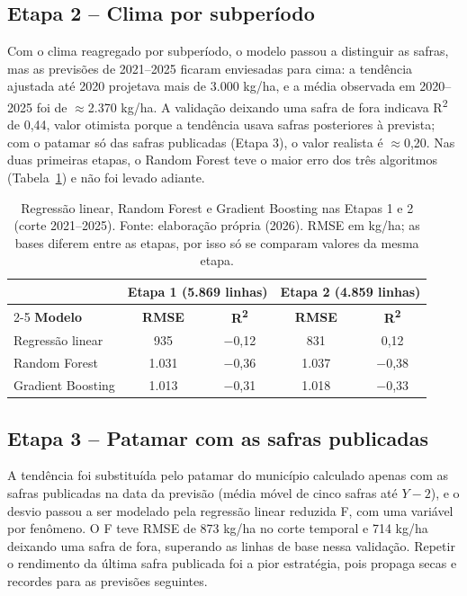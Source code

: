 \documentclass[12pt]{article}
\begin{document}
\subsection{Etapa 2 -- Clima por subperíodo}

Com o clima reagregado por subperíodo, o modelo passou a distinguir as
safras, mas as previsões de 2021--2025 ficaram enviesadas para cima: a
tendência ajustada até 2020 projetava mais de 3.000 kg/ha, e a média
observada em 2020--2025 foi de $\approx$2.370 kg/ha. A validação deixando
uma safra de fora indicava R\textsuperscript{2} de 0,44, valor otimista
porque a tendência usava safras posteriores à prevista; com o patamar só
das safras publicadas (Etapa 3), o valor realista é $\approx$0,20. Nas
duas primeiras etapas, o Random Forest teve o maior erro dos três
algoritmos (Tabela~\ref{tab:rf}) e não foi levado adiante.

\begin{table}[ht]
\centering
\caption{Regressão linear, Random Forest e Gradient Boosting nas Etapas 1
  e 2 (corte 2021--2025). Fonte: elaboração própria (2026). RMSE em
  kg/ha; as bases diferem entre as etapas, por isso só se comparam valores
  da mesma etapa.}
\label{tab:rf}
\begin{tabular}{|p{4.4cm}|c|c|c|c|}
\hline
 & \multicolumn{2}{c|}{\textbf{Etapa 1 (5.869 linhas)}} &
   \multicolumn{2}{c|}{\textbf{Etapa 2 (4.859 linhas)}} \\ \cline{2-5}
\textbf{Modelo} & \textbf{RMSE} & \textbf{R\textsuperscript{2}} &
  \textbf{RMSE} & \textbf{R\textsuperscript{2}} \\ \hline
Regressão linear & 935 & $-$0,12 & 831 & 0,12 \\ \hline
Random Forest & 1.031 & $-$0,36 & 1.037 & $-$0,38 \\ \hline
Gradient Boosting & 1.013 & $-$0,31 & 1.018 & $-$0,33 \\ \hline
\end{tabular}
\end{table}

\subsection{Etapa 3 -- Patamar com as safras publicadas}

A tendência foi substituída pelo patamar do município calculado apenas
com as safras publicadas na data da previsão (média móvel de cinco safras
até $Y-2$), e o desvio passou a ser modelado pela regressão linear
reduzida F, com uma variável por fenômeno. O F teve RMSE de 873 kg/ha no
corte temporal e 714 kg/ha deixando uma safra de fora, superando as
linhas de base nessa validação. Repetir o rendimento da última safra
publicada foi a pior estratégia, pois propaga secas e recordes para as
previsões seguintes.
\end{document}

